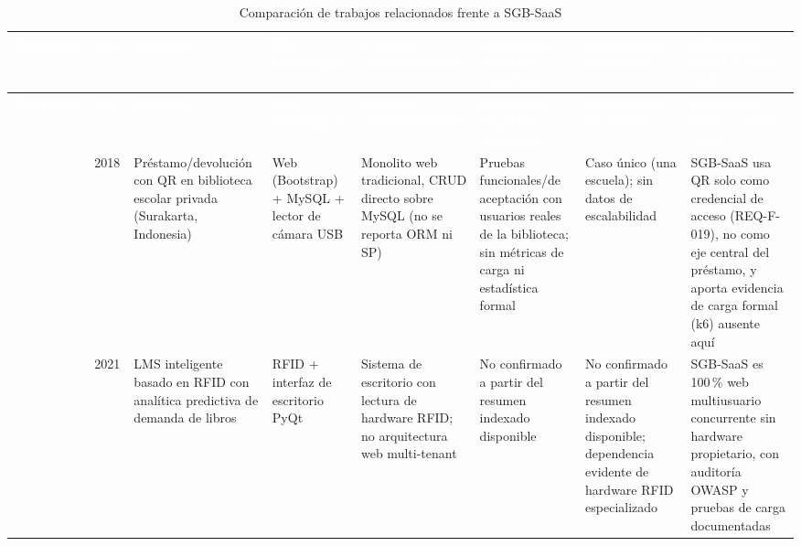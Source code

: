 \begin{landscape}
\begin{center}
\scriptsize
\renewcommand{\arraystretch}{1.15}
\setlength{\tabcolsep}{2pt}
\begin{longtable}{|p{2.0cm}|p{0.8cm}|p{2.5cm}|p{2.5cm}|p{2.8cm}|p{3.0cm}|p{2.8cm}|p{3.0cm}|}
\caption{Comparación de trabajos relacionados frente a SGB-SaaS}
\label{tab:trabajos-comparativa}\\
\hline
\rowcolor{verdeuteq}
\textcolor{white}{\textbf{Referencia}} & \textcolor{white}{\textbf{Año}} &
\textcolor{white}{\textbf{Dominio}} & \textcolor{white}{\textbf{Pila
tecnológica}} & \textcolor{white}{\textbf{Patrones arquitectónicos}} &
\textcolor{white}{\textbf{Evaluación empírica reportada}} &
\textcolor{white}{\textbf{Limitaciones declaradas}} &
\textcolor{white}{\textbf{Diferencia frente a SGB-SaaS}} \\
\hline
\endfirsthead
\hline
\rowcolor{verdeuteq}
\textcolor{white}{\textbf{Referencia}} & \textcolor{white}{\textbf{Año}} &
\textcolor{white}{\textbf{Dominio}} & \textcolor{white}{\textbf{Pila
tecnológica}} & \textcolor{white}{\textbf{Patrones arquitectónicos}} &
\textcolor{white}{\textbf{Evaluación empírica reportada}} &
\textcolor{white}{\textbf{Limitaciones declaradas}} &
\textcolor{white}{\textbf{Diferencia frente a SGB-SaaS}} \\
\hline
\endhead
\hline
\endfoot

\citet{supriyono2018qr} & 2018 &
Préstamo/devolución con QR en biblioteca escolar privada (Surakarta,
Indonesia) &
Web (Bootstrap) + MySQL + lector de cámara USB &
Monolito web tradicional, CRUD directo sobre MySQL (no se reporta ORM
ni SP) &
Pruebas funcionales/de aceptación con usuarios reales de la biblioteca;
sin métricas de carga ni estadística formal &
Caso único (una escuela); sin datos de escalabilidad &
SGB-SaaS usa QR solo como credencial de acceso (REQ-F-019), no como eje
central del préstamo, y aporta evidencia de carga formal (k6) ausente
aquí \\
\hline

\citet{mukund2021rfid} & 2021 &
LMS inteligente basado en RFID con analítica predictiva de demanda de
libros &
RFID + interfaz de escritorio PyQt &
Sistema de escritorio con lectura de hardware RFID; no arquitectura web
multi-tenant &
No confirmado a partir del resumen indexado disponible &
No confirmado a partir del resumen indexado disponible; dependencia
evidente de hardware RFID especializado &
SGB-SaaS es 100\,\% web multiusuario concurrente sin hardware
propietario, con auditoría OWASP y pruebas de carga documentadas \\
\hline


\end{longtable}
\end{center}
\end{landscape}

